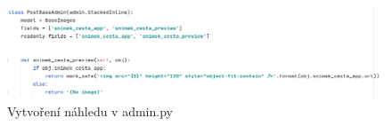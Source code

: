 \begin{figure}[H] \centering
    \includegraphics[width=450pt]{./pictures/25-vytvoreni-nahledu.PNG}
    \caption[Vytvoření náhledu v admin.py]{Vytvoření náhledu v admin.py}
	\label{fig:Vytvoření náhledu v admin.py}              
\end{figure}





































